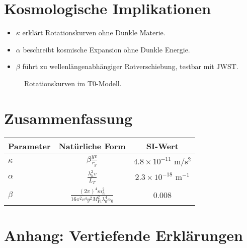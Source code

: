 \documentclass{article}
\newcommand{\Mpl}{M_{\text{Pl}}}
\begin{document}
	\section{Kosmologische Implikationen}
	\begin{itemize}
		\item \(\kappa\) erklärt Rotationskurven ohne Dunkle Materie.
		\item \(\alpha\) beschreibt kosmische Expansion ohne Dunkle Energie.
		\item \(\beta\) führt zu wellenlängenabhängiger Rotverschiebung, testbar mit JWST.
	\end{itemize}
	
\begin{figure}[h]
	\centering
	\caption{Rotationskurven im T0-Modell.}
\end{figure}
	
	\section{Zusammenfassung}
	\begin{table}[h]
		\centering
		\begin{tabular}{lcc}
			Parameter & Natürliche Form & SI-Wert \\
			\hline
			\(\kappa\) & \(\beta \frac{y v}{r_g}\) & \(4.8 \times 10^{-11}\) m/s\(^2\) \\
			\(\alpha\) & \(\frac{\lambda_h^2 v}{L_T}\) & \(2.3 \times 10^{-18}\) m\(^{-1}\) \\
			\(\beta\) & \(\frac{(2\pi)^4 m_h^2}{16\pi^2 v^4 y^2 \Mpl^2 \lambda_0^4 \alpha_0}\) & 0.008 \\
		\end{tabular}
	\end{table}
	
	\section*{Anhang: Vertiefende Erklärungen}
\end{document}
